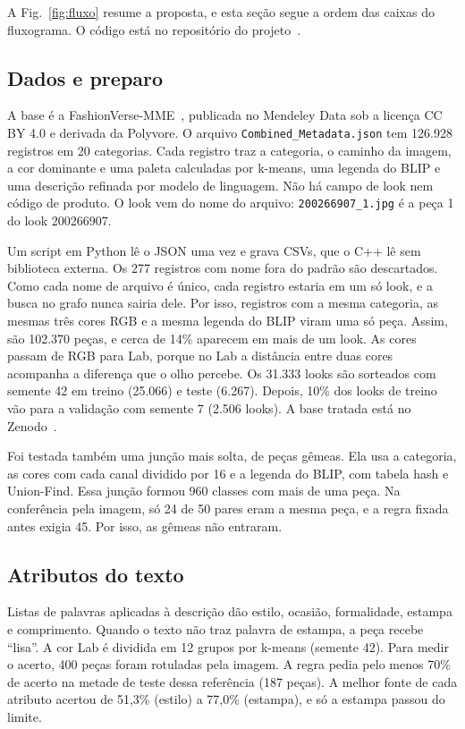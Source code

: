 A Fig.~\ref{fig:fluxo} resume a proposta, e esta seção segue a ordem das caixas do fluxograma. O código está no repositório do projeto~\cite{repositorio}.

\subsection{Dados e preparo}

A base é a FashionVerse-MME~\cite{fashionverse}, publicada no Mendeley Data sob a licença CC BY 4.0 e derivada da Polyvore. O arquivo \texttt{Combined\_Metadata.json} tem 126.928 registros em 20 categorias. Cada registro traz a categoria, o caminho da imagem, a cor dominante e uma paleta calculadas por k-means, uma legenda do BLIP e uma descrição refinada por modelo de linguagem. Não há campo de look nem código de produto. O look vem do nome do arquivo: \texttt{200266907\_1.jpg} é a peça 1 do look 200266907.

Um script em Python lê o JSON uma vez e grava CSVs, que o C++ lê sem biblioteca externa. Os 277 registros com nome fora do padrão são descartados. Como cada nome de arquivo é único, cada registro estaria em um só look, e a busca no grafo nunca sairia dele. Por isso, registros com a mesma categoria, as mesmas três cores RGB e a mesma legenda do BLIP viram uma só peça. Assim, são 102.370 peças, e cerca de 14\% aparecem em mais de um look. As cores passam de RGB para Lab, porque no Lab a distância entre duas cores acompanha a diferença que o olho percebe. Os 31.333 looks são sorteados com semente 42 em treino (25.066) e teste (6.267). Depois, 10\% dos looks de treino vão para a validação com semente 7 (2.506 looks). A base tratada está no Zenodo~\cite{zenodo}.

Foi testada também uma junção mais solta, de peças gêmeas. Ela usa a categoria, as cores com cada canal dividido por 16 e a legenda do BLIP, com tabela hash e Union-Find. Essa junção formou 960 classes com mais de uma peça. Na conferência pela imagem, só 24 de 50 pares eram a mesma peça, e a regra fixada antes exigia 45. Por isso, as gêmeas não entraram.

\subsection{Atributos do texto}

Listas de palavras aplicadas à descrição dão estilo, ocasião, formalidade, estampa e comprimento. Quando o texto não traz palavra de estampa, a peça recebe ``lisa''. A cor Lab é dividida em 12 grupos por k-means (semente 42). Para medir o acerto, 400 peças foram rotuladas pela imagem. A regra pedia pelo menos 70\% de acerto na metade de teste dessa referência (187 peças). A melhor fonte de cada atributo acertou de 51,3\% (estilo) a 77,0\% (estampa), e só a estampa passou do limite.

